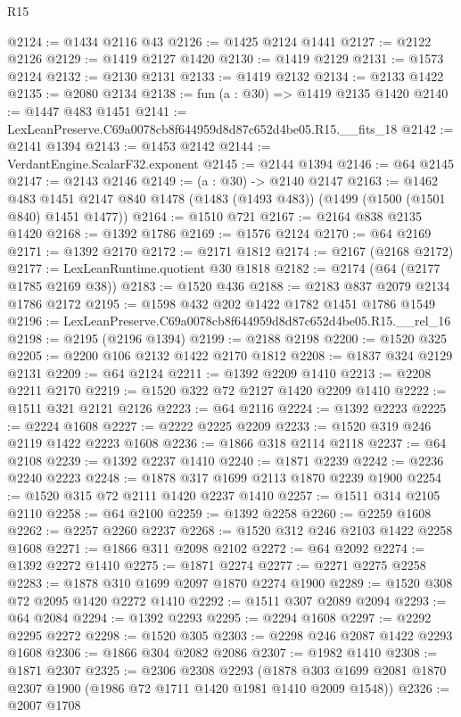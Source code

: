 \begin{lexlean}{R15}
\begin{coremodule}
@2124 := @1434 @2116 @43
@2126 := @1425 @2124 @1441
@2127 := @2122 @2126
@2129 := @1419 @2127 @1420
@2130 := @1419 @2129
@2131 := @1573 @2124
@2132 := @2130 @2131
@2133 := @1419 @2132
@2134 := @2133 @1422
@2135 := @2080 @2134
@2138 := fun (a : @30) => @1419 @2135 @1420
@2140 := @1447 @483 @1451
@2141 := LexLeanPreserve.C69a0078cb8f644959d8d87c652d4be05.R15.__fits_18
@2142 := @2141 @1394
@2143 := @1453 @2142
@2144 := VerdantEngine.ScalarF32.exponent
@2145 := @2144 @1394
@2146 := @64 @2145
@2147 := @2143 @2146
@2149 := (a : @30) -> @2140 @2147
@2163 := @1462
    @483
    @1451
    @2147
    @840
    @1478
    (@1483 (@1493 @483))
    (@1499 (@1500 (@1501 @840) @1451 @1477))
@2164 := @1510 @721
@2167 := @2164 @838 @2135 @1420
@2168 := @1392 @1786
@2169 := @1576 @2124
@2170 := @64 @2169
@2171 := @1392 @2170
@2172 := @2171 @1812
@2174 := @2167 (@2168 @2172)
@2177 := LexLeanRuntime.quotient @30 @1818
@2182 := @2174 (@64 (@2177 @1785 @2169 @38))
@2183 := @1520 @436
@2188 := @2183 @837 @2079 @2134 @1786 @2172
@2195 := @1598 @432 @202 @1422 @1782 @1451 @1786 @1549
@2196 := LexLeanPreserve.C69a0078cb8f644959d8d87c652d4be05.R15.__rel_16
@2198 := @2195 (@2196 @1394)
@2199 := @2188 @2198
@2200 := @1520 @325
@2205 := @2200 @106 @2132 @1422 @2170 @1812
@2208 := @1837 @324 @2129 @2131
@2209 := @64 @2124
@2211 := @1392 @2209 @1410
@2213 := @2208 @2211 @2170
@2219 := @1520 @322 @72 @2127 @1420 @2209 @1410
@2222 := @1511 @321 @2121 @2126
@2223 := @64 @2116
@2224 := @1392 @2223
@2225 := @2224 @1608
@2227 := @2222 @2225 @2209
@2233 := @1520 @319 @246 @2119 @1422 @2223 @1608
@2236 := @1866 @318 @2114 @2118
@2237 := @64 @2108
@2239 := @1392 @2237 @1410
@2240 := @1871 @2239
@2242 := @2236 @2240 @2223
@2248 := @1878 @317 @1699 @2113 @1870 @2239 @1900
@2254 := @1520 @315 @72 @2111 @1420 @2237 @1410
@2257 := @1511 @314 @2105 @2110
@2258 := @64 @2100
@2259 := @1392 @2258
@2260 := @2259 @1608
@2262 := @2257 @2260 @2237
@2268 := @1520 @312 @246 @2103 @1422 @2258 @1608
@2271 := @1866 @311 @2098 @2102
@2272 := @64 @2092
@2274 := @1392 @2272 @1410
@2275 := @1871 @2274
@2277 := @2271 @2275 @2258
@2283 := @1878 @310 @1699 @2097 @1870 @2274 @1900
@2289 := @1520 @308 @72 @2095 @1420 @2272 @1410
@2292 := @1511 @307 @2089 @2094
@2293 := @64 @2084
@2294 := @1392 @2293
@2295 := @2294 @1608
@2297 := @2292 @2295 @2272
@2298 := @1520 @305
@2303 := @2298 @246 @2087 @1422 @2293 @1608
@2306 := @1866 @304 @2082 @2086
@2307 := @1982 @1410
@2308 := @1871 @2307
@2325 := @2306
    @2308
    @2293
    (@1878 @303 @1699 @2081 @1870 @2307 @1900 (@1986 @72 @1711 @1420 @1981 @1410 @2009 @1548))
@2326 := @2007 @1708

\end{coremodule}
\end{lexlean}
